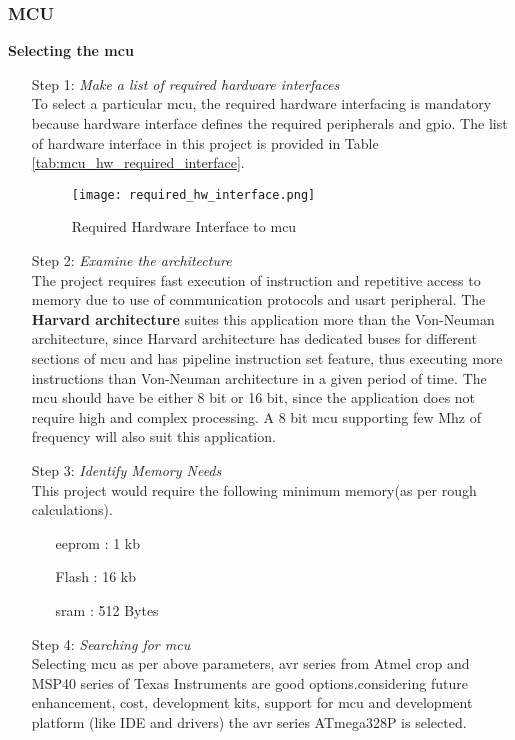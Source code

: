 
\subsubsection{MCU}
     \textbf{Selecting the \gls{mcu}}
	
	\begin{itemize}
		\item [Step 1:]\emph{ Make a list of required hardware interfaces}\\
		To select a particular \gls{mcu}, the required hardware interfacing is mandatory because hardware interface defines the required peripherals and \gls{gpio}. The list of hardware interface in this project is provided in Table   \ref{tab:mcu_hw_required_interface}.
		
	\begin{figure}[H]
		\caption{Required Hardware Interface to \gls{mcu}}
		\texttt{[image: required\_hw\_interface.png]}
		\label{img:required_hw_interface_mcu}
	\end{figure}
	
		\item [Step 2:] \emph{Examine the architecture}\\	
		The project requires fast execution of instruction  and repetitive access to memory due to use of communication protocols and \gls{usart} peripheral. The \textbf{Harvard architecture} suites this application more than the Von-Neuman architecture, since Harvard architecture has dedicated buses for different sections of \gls{mcu} and has pipeline instruction set feature, thus executing  more instructions than Von-Neuman  architecture in a given period of time. 
		The \gls{mcu} should have be either 8 bit or 16 bit, since the application does not require high and complex processing. A 8 bit \gls{mcu} supporting few Mhz of frequency will also suit this application.
		
		\item[Step 3:] \emph{Identify Memory Needs}\\
		This project would require the following minimum memory(as per rough calculations).
			\begin{itemize}
				\item[\acrshort{eeprom} :] 1 \acrshort{kb}
				
				\item[Flash :] 16 \acrshort{kb}
				
				\item[\acrshort{sram} :] 512 Bytes
			\end{itemize}
		
		
		\item[Step 4:] \emph{Searching for \gls{mcu}}\\
		Selecting \gls{mcu} as per above parameters, \gls{avr} series from Atmel crop and MSP40 series of Texas Instruments are good options.considering future enhancement, cost, development kits, support for \gls{mcu} and development platform (like IDE and drivers) the \gls{avr} series ATmega328P is selected. 		 
		 
	\end{itemize}
	
